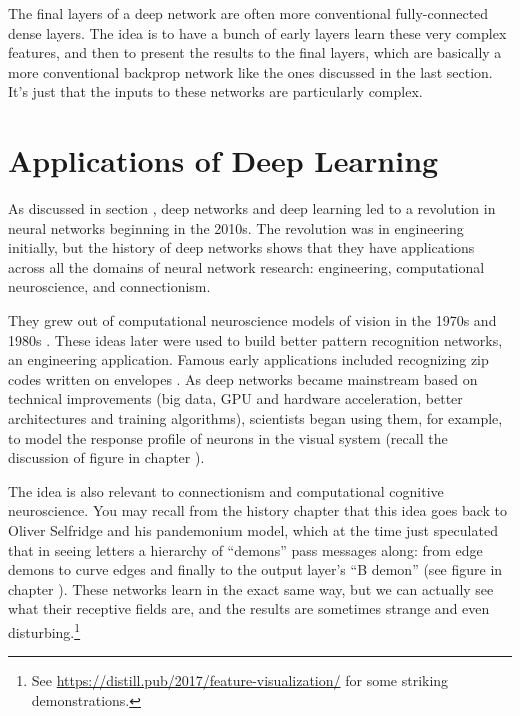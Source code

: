 The final layers of a deep network are often more conventional fully-connected dense layers. The idea is to have a bunch of early layers learn these very complex features, and then to present the results to the final layers, which are basically a more conventional backprop network like the ones discussed in the last section. It's just that the inputs to these networks are particularly complex.


\section{Applications of Deep Learning}

As discussed in section , deep networks and deep learning led to a revolution in neural networks beginning in the 2010s. The revolution was in engineering initially, but the history of deep networks shows that they have applications across all the domains of neural network research: engineering, computational neuroscience, and connectionism. 

They grew out of computational neuroscience models of vision in the 1970s and 1980s \cite{fukushima1982neocognitron}.  These ideas later were used to build better pattern recognition networks, an engineering application. Famous early applications included recognizing zip codes written on envelopes \cite{lecun1989backpropagation}. As deep networks became mainstream based on technical improvements (big data, GPU and hardware acceleration, better architectures and training algorithms), scientists began using them, for example, to model the response profile of neurons in the visual system (recall the discussion of figure  in chapter ). 

The idea is also relevant to connectionism and computational cognitive neuroscience. You may recall from the history chapter that this idea goes  back to Oliver Selfridge and his pandemonium model, which at the time just speculated that in seeing letters a hierarchy of ``demons'' pass messages along: from edge demons to curve edges and finally to the output layer's ``B demon'' (see figure  in chapter ). These networks learn in the exact same way, but we can actually  see what their receptive fields are, and the results are sometimes strange and even disturbing.\footnote{See \url{https://distill.pub/2017/feature-visualization/} for some striking demonstrations.} 
